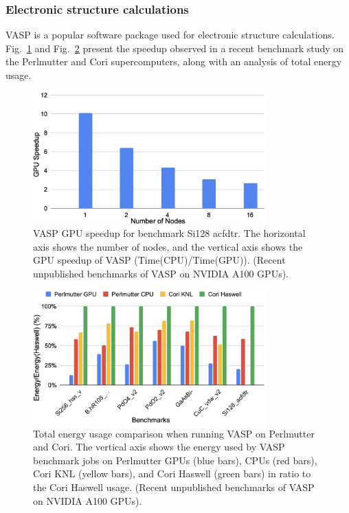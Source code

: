 \subsubsection{Electronic structure calculations}


\par
VASP is a popular software package used for electronic structure calculations.
Fig.~\ref{fig:vasp_gpu} and Fig.~\ref{fig:vasp_energy} present the speedup observed in a recent benchmark study on the Perlmutter and Cori supercomputers, along with an analysis of total energy usage.


\begin{figure}[!h]
\centering\includegraphics[width=0.8\textwidth]{fig_problem/vasp_gpu.jpg}
\caption{VASP GPU speedup for benchmark Si128 acfdtr. The horizontal axis shows the number of nodes, and the vertical axis shows the GPU speedup of VASP (Time(CPU)/Time(GPU)). (Recent unpublished benchmarks of VASP on NVIDIA A100 GPUs).}\label{fig:vasp_gpu}
\end{figure}


\begin{figure}[!h]
\centering\includegraphics[width=0.8\textwidth]{fig_problem/vasp_energy.jpg}
\caption{Total energy usage comparison when running VASP on Perlmutter and Cori. The vertical axis shows the energy used by VASP benchmark jobs on Perlmutter GPUs (blue bars), CPUs (red bars), Cori KNL (yellow bars), and Cori Haswell (green bars) in ratio to the Cori Haswell usage. (Recent unpublished benchmarks of VASP on NVIDIA A100 GPUs).}\label{fig:vasp_energy}
\end{figure}


